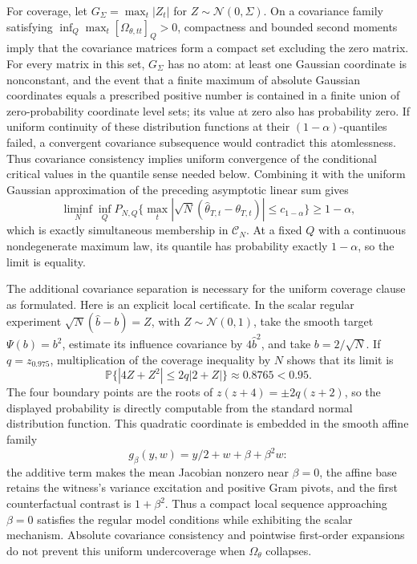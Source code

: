 For coverage, let \(G_\Sigma=\max_t|Z_t|\) for \(Z\sim\mathcal N(0,\Sigma)\).  On a covariance family satisfying \(\inf_Q\max_t[\Omega_{\theta,tt}]_Q>0\), compactness and bounded second moments imply that the covariance matrices form a compact set excluding the zero matrix.  For every matrix in this set, \(G_\Sigma\) has no atom: at least one Gaussian coordinate is nonconstant, and the event that a finite maximum of absolute Gaussian coordinates equals a prescribed positive number is contained in a finite union of zero-probability coordinate level sets; its value at zero also has probability zero.  If uniform continuity of these distribution functions at their \((1-\alpha)\)-quantiles failed, a convergent covariance subsequence would contradict this atomlessness.  Thus covariance consistency implies uniform convergence of the conditional critical values in the quantile sense needed below.  Combining it with the uniform Gaussian approximation of the preceding asymptotic linear sum gives
\[
 \liminf_N\inf_QP_{N,Q}\{\max_t|\sqrt N(\widehat\theta_{T,t}-\theta_{T,t})|\le c_{1-\alpha}\}\ge1-\alpha,
\]
which is exactly simultaneous membership in \(\mathcal C_N\).  At a fixed \(Q\) with a continuous nondegenerate maximum law, its quantile has probability exactly \(1-\alpha\), so the limit is equality.

The additional covariance separation is necessary for the uniform coverage clause as formulated.  Here is an explicit local certificate.  In the scalar regular experiment \(\sqrt N(\widehat b-b)=Z\), with \(Z\sim\mathcal N(0,1)\), take the smooth target \(\Psi(b)=b^2\), estimate its influence covariance by \(4\widehat b^2\), and take \(b=2/\sqrt N\).  If \(q=z_{0.975}\), multiplication of the coverage inequality by \(N\) shows that its limit is
\[
 \mathbb P\{|4Z+Z^2|\le2q|2+Z|\}\approx0.8765<0.95.
\]
The four boundary points are the roots of \(z(z+4)=\pm2q(z+2)\), so the displayed probability is directly computable from the standard normal distribution function.  This quadratic coordinate is embedded in the smooth affine family
\[
 g_\beta(y,w)=y/2+w+\beta+\beta^2w:
\]
the additive term makes the mean Jacobian nonzero near \(\beta=0\), the affine base retains the witness's variance excitation and positive Gram pivots, and the first counterfactual contrast is \(1+\beta^2\).  Thus a compact local sequence approaching \(\beta=0\) satisfies the regular model conditions while exhibiting the scalar mechanism.  Absolute covariance consistency and pointwise first-order expansions do not prevent this uniform undercoverage when \(\Omega_\theta\) collapses.

